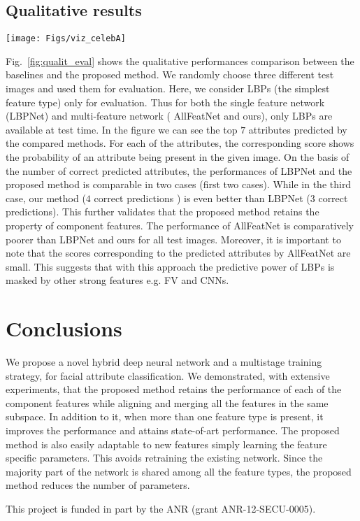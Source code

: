 \documentclass{sig-alternate-05-2015}
\begin{document}
\subsection{Qualitative results}\begin{figure*}[t]
\centering
\texttt{[image: Figs/viz\_celebA]} 
\caption{
  Qualitative results comparison of the proposed method with other methods. Top 7 attributes predicted by these methods are shown. As before green color indicates relevant attributes whereas red color indicates irrelevant attributes for the image. (Better viewed in color)
}
\label{fig:qualit_eval}
\end{figure*}
Fig.~\ref{fig:qualit_eval} shows the qualitative performances comparison between the baselines and the proposed method. We randomly choose three different test images and used them for evaluation. 
Here, we consider LBPs (the simplest feature type) only for evaluation. Thus for both the single feature network (LBPNet) and multi-feature network ( AllFeatNet and ours), only LBPs are available at test time. In the figure we can see the top $7$ attributes 
predicted by the compared methods. For each of the attributes, the corresponding score shows the probability of an attribute being present in the given image.
On the basis of the number of correct predicted attributes, the performances of LBPNet and the proposed method is comparable in two cases (first two cases). While in the third case, our method ($4$ correct predictions ) is even better than LBPNet ($3$ correct predictions). This further validates that the proposed method retains the property of component features.
 The performance of AllFeatNet is comparatively poorer than LBPNet and ours for all test images. Moreover, it is important to note that the scores corresponding to the predicted attributes by AllFeatNet  are small. This suggests that with this approach the predictive power of LBPs is masked by other strong features e.g. FV and CNNs. 
 
\section{Conclusions}\label{sec:concls}
We propose a novel hybrid deep neural network and a multistage training strategy, for facial attribute classification. We demonstrated, with extensive experiments, that the proposed method retains the performance of each of the component features while aligning and merging  all the features in the same subspace. In addition to it, when more than one feature type is present, it improves the performance and attains state-of-art performance. The proposed method is also easily adaptable to new features simply learning the feature specific parameters. This avoids retraining the existing network. Since the majority part of the network is shared among all the feature types, the proposed method reduces the number of parameters.

\vspace{.5em}{\bf Acknowledgments} This project is funded in part by the ANR (grant ANR-12-SECU-0005). 


\end{document}
